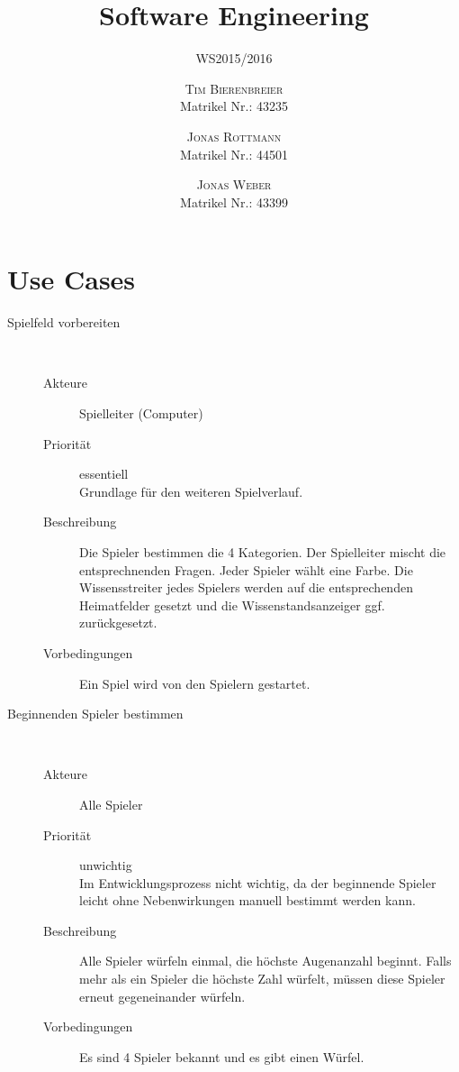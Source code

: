 \documentclass{scrartcl} %
\title{Software Engineering}
\subtitle{WS2015/2016} %
\author{
	\textsc{Tim Bierenbreier}\\
	\normalsize Matrikel Nr.: 43235
	\and
	\textsc{Jonas Rottmann}\\
	\normalsize Matrikel Nr.: 44501
	\and
	\textsc{Jonas Weber}\\
	\normalsize Matrikel Nr.: 43399
}
\begin{document}
\maketitle
\section{Use Cases}

\begin{description}
   \item[Spielfeld vorbereiten]~\par
   \begin{description}
      \item[Akteure] Spielleiter (Computer)
      \item[Priorität] essentiell\\Grundlage für den weiteren Spielverlauf.
      \item[Beschreibung] Die Spieler bestimmen die 4 Kategorien. Der Spielleiter mischt die entsprechnenden Fragen. Jeder Spieler wählt eine Farbe. Die Wissensstreiter jedes Spielers werden auf die entsprechenden Heimatfelder gesetzt und die Wissenstandsanzeiger ggf. zurückgesetzt.
      \item[Vorbedingungen] Ein Spiel wird von den Spielern gestartet.          
   \end{description}
   

   \item[Beginnenden Spieler bestimmen]~\par
   \begin{description}
      \item[Akteure] Alle Spieler
      \item[Priorität] unwichtig\\Im Entwicklungsprozess nicht wichtig, da der beginnende Spieler leicht ohne Nebenwirkungen manuell bestimmt werden kann.
      \item[Beschreibung] Alle Spieler würfeln einmal, die höchste Augenanzahl beginnt. Falls mehr als ein Spieler die höchste Zahl würfelt, müssen diese Spieler erneut gegeneinander würfeln.
      \item[Vorbedingungen] Es sind 4 Spieler bekannt und es gibt einen Würfel.
   \end{description}
   


\end{description}
\end{document}

